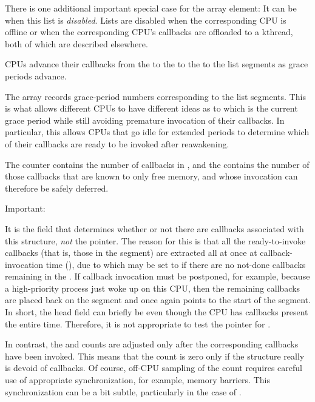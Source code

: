 There is one additional important special case for the
 array element:
It can be  when this
list is \emph{disabled}.
Lists are disabled when the corresponding CPU is
offline or when the corresponding CPU's callbacks are offloaded to a
kthread, both of which are described elsewhere.

CPUs advance their callbacks from the  to the
 to the  to the
 list segments as grace periods advance.

The  array records grace-period numbers corresponding to
the list segments.
This is what allows different CPUs to have different
ideas as to which is the current grace period while still avoiding
premature invocation of their callbacks.
In particular, this allows CPUs
that go idle for extended periods to determine which of their callbacks
are ready to be invoked after reawakening.

The  counter contains the number of callbacks in ,
and the  contains the number of those callbacks that are
known to only free memory, and whose invocation can therefore be safely
deferred.

\begin{Note}
   Important:

   It is the  field that determines whether or
   not there are callbacks associated with this 
   structure, \emph{not} the  pointer.
   The reason for this is that all
   the ready-to-invoke callbacks (that is, those in the 
   segment) are extracted all at once at callback-invocation time
   (), due to which  may be set to  if there
   are no not-done callbacks remaining in the .
   If
   callback invocation must be postponed, for example, because a
   high-priority process just woke up on this CPU, then the remaining
   callbacks are placed back on the  segment and
    once again points to the start of the segment.
   In short, the
   head field can briefly be  even though the CPU has callbacks
   present the entire time.
   Therefore, it is not appropriate to test the
    pointer for .
\end{Note}

In contrast, the  and  counts are adjusted only
after the corresponding callbacks have been invoked.
This means that the
 count is zero only if the  structure really
is devoid of callbacks.
Of course, off-CPU sampling of the 
count requires careful use of appropriate synchronization, for example,
memory barriers.
This synchronization can be a bit subtle, particularly
in the case of .

